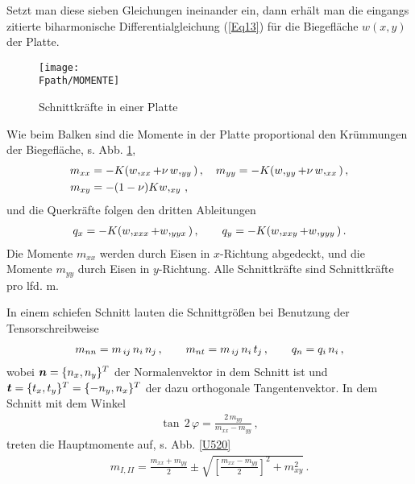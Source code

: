 Setzt man diese sieben Gleichungen ineinander ein, dann erh\"{a}lt man die eingangs zitierte biharmonische Differentialgleichung (\ref{Eq13}) f\"{u}r die Biegefl\"{a}che $w(x,y)$ der Platte.
\begin{figure}[tbp]
\centering
\if {} \sidecaption \fi
\texttt{[image: \\Fpath/MOMENTE]}
\caption{Schnittkr\"{a}fte in einer Platte} \label{Momente}
\end{figure}%

Wie beim Balken sind die Momente in der Platte proportional den Kr\"{u}mmungen der Biegefl\"{a}che, s. Abb. \ref{Momente},
\begin{align}
    m_{xx} &= - K(w,_{xx} + \nu\, w,_{yy})\,, \quad    m_{yy} = -
K(w,_{yy} + \nu\, w,_{xx})\,, \nonumber \\
    m_{xy} &= - (1-\nu) K w,_{xy}\,,\nonumber
\end{align}
und die Querkr\"{a}fte folgen den dritten Ableitungen
\begin{align}
    q_x = - K(w,_{xxx} + w,_{yyx})\,, \qquad   q_y = -
K(w,_{xxy} + w,_{yyy}) \nonumber \,.
\end{align}
Die Momente $m_{xx}$ werden durch Eisen in $x$-Richtung abgedeckt,
und die Momente $m_{yy}$ durch Eisen in $y$-Richtung.
Alle Schnittkr\"{a}fte sind Schnittkr\"{a}fte pro lfd. m.


In einem schiefen Schnitt lauten die Schnittgr\"{o}{\ss}en bei Benutzung der Tensorschreibweise
\begin{align}
m_{nn} = m_{\,ij}\, n_i\,n_j\,, \qquad m_{nt} = m_{\,ij}\, n_i\,t_j\,, \qquad q_n = q_i\, n_i
\,,\nonumber
\end{align}
wobei $\mbox{\boldmath $n$} = \{n_x,n_y\}^T$ der Normalenvektor in dem Schnitt ist und $\mbox{\boldmath $t$} =
\{t_x,t_y\}^T = \{-n_y,n_x\}^T$ der dazu orthogonale Tangentenvektor. In dem Schnitt mit dem Winkel
\begin{align}
\tan\,2\,\varphi = \frac{2\,m_{yy}}{m_{xx} - m_{yy}}\,,
\end{align}
treten die Hauptmomente auf, s. Abb. \ref{U520}
\begin{align}
m_{I,II} = \frac{m_{xx} + m_{yy}}{2} \pm \sqrt{\left[\frac{m_{xx} - m_{yy}}{2}\right]^2 +
m_{xy}^2}\,.
\end{align}

